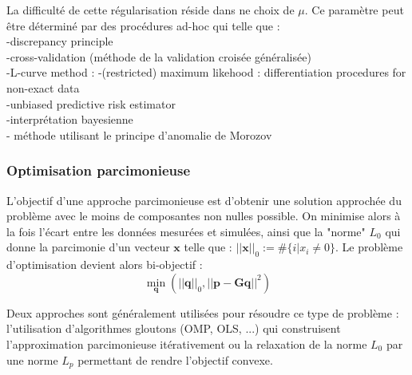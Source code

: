La difficulté de cette régularisation réside dans ne choix de $\mu$. Ce paramètre peut être déterminé par des procédures ad-hoc qui telle que : \\
-discrepancy principle\\
-cross-validation (méthode de la validation croisée généralisée)\\
-L-curve method : %
-(restricted) maximum likehood : %
differentiation procedures for non-exact data\\
-unbiased predictive risk estimator\\
-interprétation bayesienne \citep{Pereira2015}\\
- méthode utilisant le principe d’anomalie de Morozov\\

\subsubsection{Optimisation parcimonieuse}
L'objectif d'une approche parcimonieuse est d'obtenir une solution approchée du problème avec le moins de composantes non nulles possible. On minimise alors à la fois l'écart entre les données mesurées et simulées, ainsi que la "norme" $L_0$ qui donne la parcimonie d'un vecteur $\bm{x}$ telle que : $||\bm{x}||_0 := \#\{i|x_i\neq0\}$. Le problème d'optimisation devient alors bi-objectif : 
\begin{equation}
	\min_{\bm{q}}(||\bm{q}||_0 , ||\bm{p}-\bm{G}\bm{q}||^2) 
\end{equation}

Deux approches sont généralement utilisées pour résoudre ce type de problème : l'utilisation d'algorithmes gloutons (OMP, OLS, ...) qui construisent l'approximation parcimonieuse itérativement ou la relaxation de la norme $L_0$ par une norme $L_p$ permettant de rendre l'objectif convexe.


